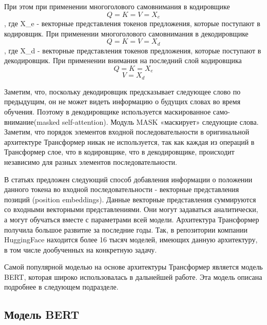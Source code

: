 При этом при применении многоголового самовнимания в кодировщике
\begin{equation}
    Q = K = V = X_e
\end{equation},
где X\_e - векторные представления токенов предложения, которые поступают в кодировщик.
При применении многоголового самовнимания в декодировщике
\begin{equation}
    Q = K = V = X_d
\end{equation},
где X\_d - векторные представления токенов предложения, которые поступают в декодировщик.
При применении внимания на последний слой кодировщика
\begin{equation}
    Q = K = X_e
\end{equation}
\begin{equation}
    V = X_d
\end{equation}

 Заметим, что, поскольку декодировщик предсказывает следующее слово по предыдущим, он не может видеть информацию о будущих словах во время обучения. Поэтому в декодировщике используется маскированное само-внимание(masked self-attention). Модуль MASK «маскирует» следующие слова.
Заметим, что порядок элементов входной последовательности в оригинальной архитектуре Трансформер никак не используется, так как каждая из операций в Трансформер слое, что в кодировщике, что в декодировщике, происходит независимо для разных элементов последовательности. 

В статьях \cite{devlin_2018,gehring_2017,vaswani_2017} предложен следующий способ добавления информации о положении данного токена во входной последовательности - векторные представления позиций (position embeddings). Данные векторные представления суммируются со входными векторными представлениями. Они могут задаваться аналитически, а могут обучаться вместе с параметрами всей модели.
Архитектура Трансформер получила большое развитие за последние годы. Так, в репозитории компании HuggingFace \cite{na_website_ndaa} находится более 16 тысяч моделей, имеющих данную архитектуру, в том числе дообученных на конкретную задачу. 

Самой популярной моделью на основе архитектуры Трансформер является модель BERT, которая широко использовалась в дальнейшей работе. Эта модель описана подробнее в следующем подразделе. 

\subsection{Модель BERT}

